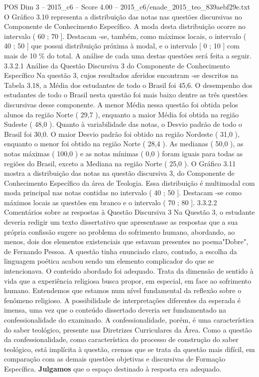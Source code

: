 \begin{textsample}{POS Dim 3 – 2015\_c6 – Score 4.00 – 2015\_c6/enade\_2015\_teo\_839aebf29e.txt}
O Gráfico 3.10 representa a distribuição das notas nas questões discursivas no Componente de Conhecimento Específico.
A moda desta distribuição ocorre no intervalo ( 60 ; 70 ].
Destacam -se, também, como máximos locais, o intervalo ( 40 ; 50 ] que possui distribuição próxima à modal, e o intervalo [ 0 ; 10 ] com mais de 10 \% do total.
A análise de cada uma destas questões será feita a seguir. 3.3.2.1 Análise da Questão Discursiva 3 do Componente de Conhecimento Específico Na questão 3, cujos resultados aferidos encontram -se descritos na Tabela 3.18, a Média dos estudantes de todo o Brasil foi 45,6.
O desempenho dos estudantes de todo o Brasil nesta questão foi mais baixo dentre as três questões discursivas desse componente.
A menor Média nessa questão foi obtida pelos alunos da região Norte ( 29,7 ), enquanto a maior Média foi obtida na região Sudeste ( 48,0 ).
Quanto à variabilidade das notas, o Desvio padrão de todo o Brasil foi 30,0.
O maior Desvio padrão foi obtido na região Nordeste ( 31,0 ), enquanto o menor foi obtido na região Norte ( 28,4 ).
As medianas ( 50,0 ), as notas máximas ( 100,0 ) e as notas mínimas ( 0,0 ) foram iguais para todas as regiões do Brasil, exceto a Mediana na região Norte ( 25,0 ).
O Gráfico 3.11 mostra a distribuição das notas na questão discursiva 3, do Componente de Conhecimento Específico da área de Teologia.
Essa distribuição é multimodal com moda principal nas notas contidas no intervalo ( 40 ; 50 ].
Destacam -se como máximos locais as questões em branco e o intervalo ( 70 ; 80 ]. 3.3.2.2 Comentários sobre as respostas à Questão Discursiva 3 Na Questão 3, o estudante deveria redigir um texto dissertativo que apresentasse as respostas que a sua própria confissão sugere ao problema do sofrimento humano, abordando, ao menos, dois dos elementos existenciais que estavam presentes no poema"Dobre", de Fernando Pessoa.
A questão tinha enunciado claro, contudo, a escolha da linguagem poética acabou sendo um elemento complicador do que se intencionava.
O conteúdo abordado foi adequado.
Trata da dimensão de sentido à vida que a experiência religiosa busca propor, em especial, em face ao sofrimento humano.
Entendemos que estamos num nível fundamental da reflexão sobre o fenômeno religioso.
A possibilidade de interpretações diferentes da esperada é imensa, uma vez que o conteúdo dissertado deveria ser fundamentado na confessionalidade do examinado.
A confessionalidade, porém, é uma característica do saber teológico, presente nas Diretrizes Curriculares da Área.
Como a questão da confessionalidade, como característica do processo de construção do saber teológico, está implícita à questão, cremos que se trata da questão mais difícil, em comparação com as demais questões objetivas e discursivas de Formação Específica. \textbf{Julgamos} que o espaço destinado à resposta era adequado.

\end{textsample}
